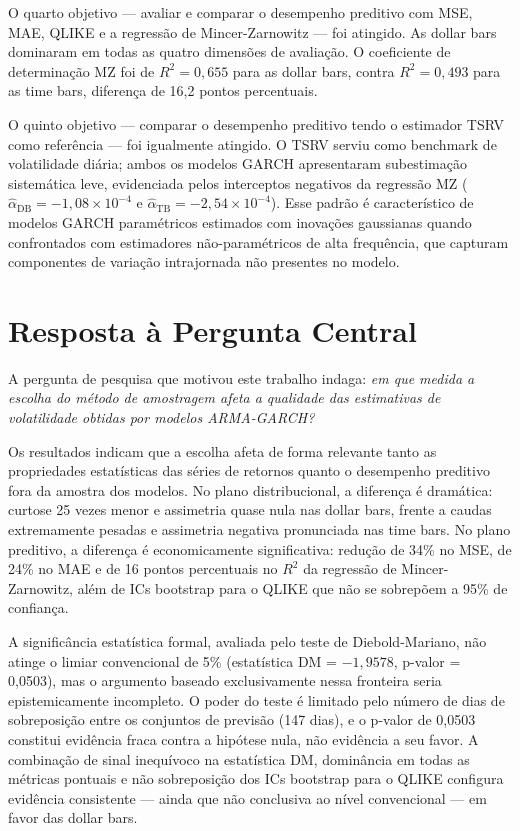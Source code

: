 O quarto objetivo — avaliar e comparar o desempenho preditivo com MSE, MAE, QLIKE e
a regressão de Mincer-Zarnowitz — foi atingido. As dollar bars dominaram em todas as
quatro dimensões de avaliação. O coeficiente de determinação MZ foi de $R^2 = 0{,}655$
para as dollar bars, contra $R^2 = 0{,}493$ para as time bars, diferença de 16,2 pontos
percentuais.

O quinto objetivo — comparar o desempenho preditivo tendo o estimador TSRV como
referência — foi igualmente atingido. O TSRV serviu como benchmark de volatilidade diária;
ambos os modelos GARCH apresentaram subestimação sistemática leve, evidenciada pelos
interceptos negativos da regressão MZ ($\hat{\alpha}_{\text{DB}} = -1{,}08 \times 10^{-4}$
e $\hat{\alpha}_{\text{TB}} = -2{,}54 \times 10^{-4}$). Esse padrão é característico de
modelos GARCH paramétricos estimados com inovações gaussianas quando confrontados com
estimadores não-paramétricos de alta frequência, que capturam componentes de variação
intrajornada não presentes no modelo.

\section{Resposta à Pergunta Central}
\label{sec:resposta_central}

A pergunta de pesquisa que motivou este trabalho indaga: \textit{em que medida a escolha
do método de amostragem afeta a qualidade das estimativas de volatilidade obtidas por
modelos ARMA-GARCH?}

Os resultados indicam que a escolha afeta de forma relevante tanto as propriedades
estatísticas das séries de retornos quanto o desempenho preditivo fora da amostra dos
modelos. No plano distribucional, a diferença é dramática: curtose 25 vezes menor e
assimetria quase nula nas dollar bars, frente a caudas extremamente pesadas e assimetria
negativa pronunciada nas time bars. No plano preditivo, a diferença é economicamente
significativa: redução de 34\% no MSE, de 24\% no MAE e de 16 pontos percentuais no
$R^2$ da regressão de Mincer-Zarnowitz, além de ICs bootstrap para o QLIKE que não
se sobrepõem a 95\% de confiança.

A significância estatística formal, avaliada pelo teste de Diebold-Mariano, não atinge
o limiar convencional de 5\% (estatística DM = $-1{,}9578$, p-valor = 0,0503), mas
o argumento baseado exclusivamente nessa fronteira seria epistemicamente incompleto.
O poder do teste é limitado pelo número de dias de sobreposição entre os conjuntos de
previsão (147 dias), e o p-valor de 0,0503 constitui evidência fraca contra a hipótese
nula, não evidência a seu favor. A combinação de sinal inequívoco na estatística DM,
dominância em todas as métricas pontuais e não sobreposição dos ICs bootstrap para o QLIKE
configura evidência consistente — ainda que não conclusiva ao nível convencional — em
favor das dollar bars.

